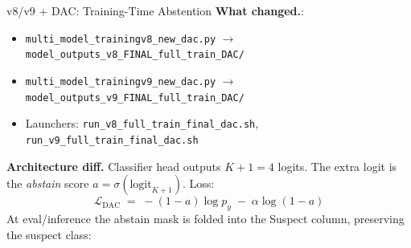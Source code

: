 \documentclass[aspectratio=169]{beamer}
\begin{document}
\begin{frame}{v8/v9 + DAC: Training-Time Abstention}
  \textbf{What changed.}:
  \begin{itemize}
    \tiny
    \item \texttt{multi\_model\_trainingv8\_new\_dac.py} \;$\rightarrow$\;
          \texttt{model\_outputs\_v8\_FINAL\_full\_train\_DAC/}
    \item \texttt{multi\_model\_trainingv9\_new\_dac.py} \;$\rightarrow$\;
          \texttt{model\_outputs\_v9\_FINAL\_full\_train\_DAC/}
    \item Launchers: \texttt{run\_v8\_full\_train\_final\_dac.sh},
          \texttt{run\_v9\_full\_train\_final\_dac.sh}
  \end{itemize}

  \medskip
  \textbf{Architecture diff.} Classifier head outputs $K\!+\!1=4$ logits.
  The extra logit is the \emph{abstain} score $a=\sigma(\text{logit}_{K+1})$.
  Loss:
  \[
    \mathcal{L}_{\text{DAC}} \;=\; -(1-a)\log p_y \;-\; \alpha\log(1-a)
  \]
  At eval/inference the abstain mask is folded into the Suspect column,
  preserving the suspect class:

\end{frame}

\end{document}
